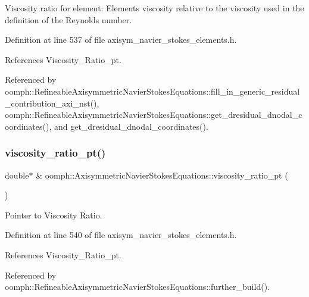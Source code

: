 Viscosity ratio for element\+: Element\textquotesingle{}s viscosity relative to the viscosity used in the definition of the Reynolds number. 



Definition at line 537 of file axisym\+\_\+navier\+\_\+stokes\+\_\+elements.\+h.



References Viscosity\+\_\+\+Ratio\+\_\+pt.



Referenced by oomph\+::\+Refineable\+Axisymmetric\+Navier\+Stokes\+Equations\+::fill\+\_\+in\+\_\+generic\+\_\+residual\+\_\+contribution\+\_\+axi\+\_\+nst(), oomph\+::\+Refineable\+Axisymmetric\+Navier\+Stokes\+Equations\+::get\+\_\+dresidual\+\_\+dnodal\+\_\+coordinates(), and get\+\_\+dresidual\+\_\+dnodal\+\_\+coordinates().

\mbox{\label{classoomph_1_1AxisymmetricNavierStokesEquations_a50dcf24d5162fa8f5fd8a6efc4df17b7}} 
\subsubsection{\texorpdfstring{viscosity\+\_\+ratio\+\_\+pt()}{viscosity\_ratio\_pt()}}
{\footnotesize\ttfamily double$\ast$ \& oomph\+::\+Axisymmetric\+Navier\+Stokes\+Equations\+::viscosity\+\_\+ratio\+\_\+pt (\begin{DoxyParamCaption}{ }\end{DoxyParamCaption})\hspace{0.3cm}{\ttfamily [inline]}}



Pointer to Viscosity Ratio. 



Definition at line 540 of file axisym\+\_\+navier\+\_\+stokes\+\_\+elements.\+h.



References Viscosity\+\_\+\+Ratio\+\_\+pt.



Referenced by oomph\+::\+Refineable\+Axisymmetric\+Navier\+Stokes\+Equations\+::further\+\_\+build().



